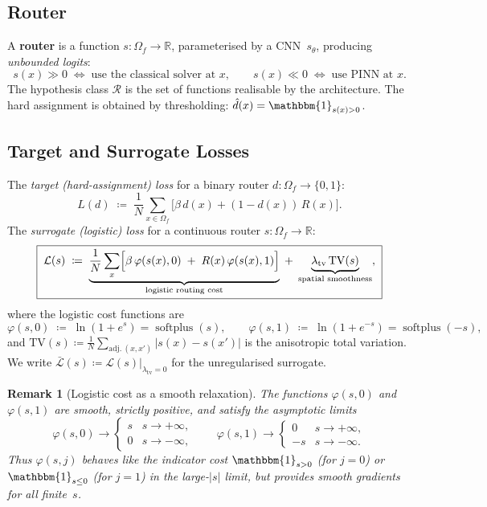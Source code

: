 \documentclass[11pt]{article}
\newtheorem{remark}[theorem]{Remark}
\DeclareMathOperator{\softplus}{softplus}
\newcommand{\R}{\mathbb{R}}
\newcommand{\Lcal}{\mathcal{L}}
\newcommand{\Rcal}{\mathcal{R}}
\newcommand{\TV}{\mathrm{TV}}
\newcommand{\ind}{\mathbbm{1}}
\begin{document}
\subsection{Router}

A \textbf{router} is a function $s \colon \Omega_f \to \R$, parameterised by a
CNN~$s_\theta$, producing \emph{unbounded logits}:
\[
  s(x) \gg 0 \;\Longleftrightarrow\; \text{use the classical solver at } x,
  \qquad
  s(x) \ll 0 \;\Longleftrightarrow\; \text{use PINN at } x.
\]
The hypothesis class $\Rcal$ is the set of functions realisable by the architecture.
The hard assignment is obtained by thresholding: $\hat{d}(x) = \ind_{s(x) > 0}$.

\subsection{Target and Surrogate Losses}

The \emph{target (hard-assignment) loss} for a binary router
$d \colon \Omega_f \to \{0,1\}$:
\begin{equation}\label{eq:target}
  L(d) \;\coloneqq\; \frac{1}{N}\sum_{x \in \Omega_f}
    \bigl[\beta\,d(x) + (1 - d(x))\,R(x)\bigr].
\end{equation}
The \emph{surrogate (logistic) loss} for a continuous router
$s \colon \Omega_f \to \R$:
\begin{equation}\label{eq:surrogate}
  \boxed{\;
  \Lcal(s) \;\coloneqq\;
    \underbrace{\frac{1}{N}\sum_{x}
      \Bigl[\beta\,\varphi(s(x), 0)
        \;+\; R(x)\,\varphi(s(x), 1)\Bigr]}_{\text{logistic routing cost}}
    \;+\; \underbrace{\lambda_{\mathrm{tv}}\,\TV(s)}_{\text{spatial smoothness}},
  \;}
\end{equation}
where the logistic cost functions are
\begin{equation}\label{eq:phi}
  \varphi(s, 0) \;\coloneqq\; \ln(1 + e^{s}) = \softplus(s),
  \qquad
  \varphi(s, 1) \;\coloneqq\; \ln(1 + e^{-s}) = \softplus(-s),
\end{equation}
and $\TV(s) \coloneqq \frac{1}{N}\sum_{\text{adj.}~(x,x')} |s(x) - s(x')|$ is the
anisotropic total variation.  We write
$\bar{\Lcal}(s) \coloneqq
  \Lcal(s)\big|_{\lambda_{\mathrm{tv}}=0}$ for the
unregularised surrogate.

\begin{remark}[Logistic cost as a smooth relaxation]\label{rem:logistic}
The functions $\varphi(s,0)$ and $\varphi(s,1)$ are smooth, strictly positive, and
satisfy the asymptotic limits
\[
  \varphi(s,0) \to
    \begin{cases} s & s \to +\infty, \\ 0 & s \to -\infty, \end{cases}
  \qquad
  \varphi(s,1) \to
    \begin{cases} 0 & s \to +\infty, \\ -s & s \to -\infty. \end{cases}
\]
Thus $\varphi(s,j)$ behaves like the indicator cost $\ind_{s > 0}$ (for $j=0$) or
$\ind_{s \le 0}$ (for $j=1$) in the large-$|s|$ limit, but provides smooth gradients
for all finite~$s$.
\end{remark}
\end{document}
